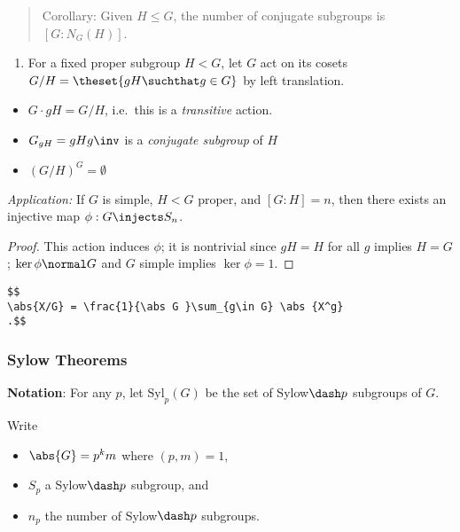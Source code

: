\begin{quote}
Corollary: Given \(H \leq G\), the number of conjugate subgroups is
\([G: N_G(H)]\).
\end{quote}

\begin{enumerate}
\def\labelenumi{\arabic{enumi}.}
\tightlist
\item
  For a fixed proper subgroup \(H< G\), let \(G\) act on its cosets
  \(G/H = \theset{gH\suchthat g\in G}\) by left translation.
\end{enumerate}

\begin{itemize}
\item
  \(G\cdot gH = G/H\), i.e.~this is a \emph{transitive} action.
\item
  \(G_{gH} = gHg\inv\) is a \emph{conjugate subgroup} of \(H\)
\item
  \((G/H)^G = \emptyset\)
\end{itemize}

\emph{Application:} If \(G\) is simple, \(H < G\) proper, and
\([G:H] = n\), then there exists an injective map
\(\phi: G \injects S_n\).

\begin{proof}

This action induces \(\phi\); it is nontrivial since \(gH = H\) for all
\(g\) implies \(H = G\); \(\ker \phi \normal G\) and \(G\) simple
implies \(\ker \phi = 1\).

\end{proof}

\begin{theorem}

\begin{verbatim}
$$
\abs{X/G} = \frac{1}{\abs G }\sum_{g\in G} \abs {X^g}
.$$
\end{verbatim}

\end{theorem}

\hypertarget{sylow-theorems}{%
\subsubsection{Sylow Theorems}\label{sylow-theorems}}

\textbf{Notation}: For any \(p\), let \(\mathrm{Syl}_p(G)\) be the set
of Sylow\(\dash p\) subgroups of \(G\).

Write

\begin{itemize}
\tightlist
\item
  \(\abs{G} = p^k m\) where \((p, m) = 1\),
\item
  \(S_p\) a Sylow\(\dash p\) subgroup, and
\item
  \(n_p\) the number of Sylow\(\dash p\) subgroups.
\end{itemize}

